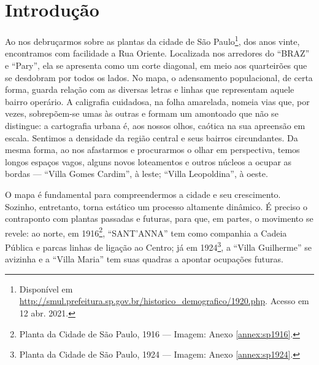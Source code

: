 \begin{refsection}
\begin{otherlanguage}{english}
    \end{otherlanguage}

    \section{Introdução}

    Ao nos debruçarmos sobre as plantas da cidade de São Paulo\footnote{Disponível em \url{http://smul.prefeitura.sp.gov.br/historico_demografico/1920.php}. Acesso em 12 abr. 2021.}, dos anos vinte, encontramos com facilidade a Rua Oriente. Localizada nos arredores do ``BRAZ'' e ``Pary'', ela se apresenta como um corte diagonal, em meio aos quarteirões que se desdobram por todos os lados. No mapa, o adensamento populacional, de certa forma, guarda relação com as diversas letras e linhas que representam aquele bairro operário. A caligrafia cuidadosa, na folha amarelada, nomeia vias que, por vezes, sobrepõem-se umas às outras e formam um amontoado que não se distingue: a cartografia urbana é, aos nossos olhos, caótica na sua apreensão em escala. Sentimos a densidade da região central e seus bairros circundantes. Da mesma forma, ao nos afastarmos e procurarmos o olhar em perspectiva, temos longos espaços vagos, alguns novos loteamentos e outros núcleos a ocupar as bordas --- ``Villa Gomes Cardim'', à leste; ``Villa Leopoldina'', à oeste.  

    O mapa é fundamental para compreendermos a cidade e seu crescimento. Sozinho, entretanto, torna estático um processo altamente dinâmico. É preciso o contraponto com plantas passadas e futuras, para que, em partes, o movimento se revele: ao norte, em 1916\footnote{Planta da Cidade de São Paulo, 1916 --- Imagem: Anexo \ref{annex:sp1916}.}, ``SANT'ANNA'' tem como companhia a Cadeia Pública e parcas linhas de ligação ao Centro; já em 1924\footnote{Planta da Cidade de São Paulo, 1924 --- Imagem: Anexo \ref{annex:sp1924}.}, a ``Villa Guilherme'' se avizinha e a ``Villa Maria'' tem suas quadras a apontar ocupações futuras.  


\end{refsection}
